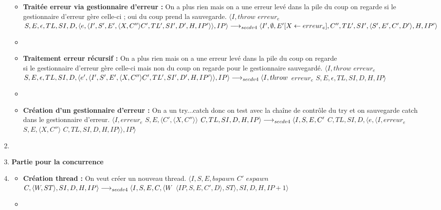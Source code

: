 \documentclass[10pt,a4paper]{article}
\begin{document}
\begin{enumerate}
\begin{itemize}
			    	\item[] \textbf{Traitée erreur via gestionnaire d'erreur :} On a plus rien mais on a une erreur levé dans la pile du coup on regarde si le gestionnaire d'erreur gère celle-ci ; oui du coup prend la sauvegarde.
			    	\smallbreak 
			    	$\langle I,throw$ $erreur_{e}$ $S,E,\epsilon,TL,SI,D,\langle e,\langle I',S',E',\langle X,C'' \rangle C',TL',SI',D',H,IP'\rangle\rangle,IP\rangle \\\longrightarrow_{secdv4} \langle I',\emptyset,E'[X \leftarrow erreur_{e}],C'',TL',SI',\langle S',E',C',D'\rangle,H,IP'\rangle$
			    	\item[]
			    	
			    	\item[]  \textbf{Traitement erreur récursif :} On a plus rien mais on a une erreur levé dans la pile du coup on regarde 
			    	\\si le gestionnaire d'erreur gère celle-ci mais non du coup on regarde pour le gestionnaire sauvegardé.
			    	\smallbreak 
			    	$\langle I,throw$ $erreur_{e}$ $S,E,\epsilon,TL,SI,D,\langle e',\langle I',S',E',\langle X,C'' \rangle C',TL',SI',D',H,IP'\rangle\rangle,IP\rangle \\\longrightarrow_{secdv4}\langle I,throw$ $erreur_{e}$ $S,E,\epsilon,TL,SI,D,H,IP\rangle$
			    	\item[]
			    	\newpage
			    	
			    	\item[]  \textbf{Création d'un gestionnaire d'erreur :} On a un try...catch donc on test avec la chaîne de contrôle du try et on sauvegarde catch dans le gestionnaire d'erreur.
			    	\smallbreak 
			    	$\langle I,erreur_{e}$ $S,E,\langle C',\langle X,C''\rangle\rangle$ $C,TL,SI,D,H,IP\rangle 
			    	\\\longrightarrow_{secdv4} \langle I,S,E,C'$ $C,TL,SI,D,\langle e,\langle I,erreur_{e}$ $S,E,\langle X,C'' \rangle$ $C,TL,SI,D,H,IP\rangle\rangle,IP\rangle$
			    \end{itemize}
			    
			    \item[]
			
			    
			 
			    
			    \item[] \textbf{Partie pour la concurrence} 
			    \item[]
			    \begin{itemize}
			    	\item[]  \textbf{Création thread :} On veut créer un nouveau thread.
			    	\smallbreak $\langle I,S,E,bspawn$ $C'$ $espawn$ $C,\langle W,ST\rangle,SI,D,H,IP\rangle 
			    	\\\longrightarrow_{secdv4} \langle I,S,E,C,\langle W$ $\langle IP,S,E,C',D\rangle,ST\rangle,SI,D,H,IP+1\rangle$
			    	\item[]
			    	

\end{itemize}
\end{enumerate}
\end{document}
